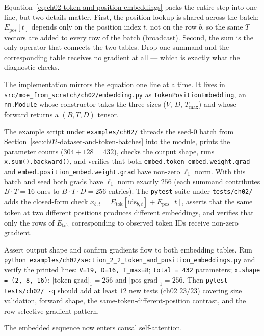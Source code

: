 

Equation~\ref{eq:ch02-token-and-position-embeddings} packs the entire step into one line, but two details matter. First, the position lookup is shared across the batch: $E_{\text{pos}}[t]$ depends only on the position index $t$, not on the row $b$, so the same $T$ vectors are added to every row of the batch (broadcast). Second, the sum is the only operator that connects the two tables. Drop one summand and the corresponding table receives no gradient at all --- which is exactly what the diagnostic checks.

The implementation mirrors the equation one line at a time. It lives in \texttt{src/moe\_from\_scratch/ch02/embedding.py} as \texttt{TokenPositionEmbedding}, an \texttt{nn.Module} whose constructor takes the three sizes ($V$, $D$, $T_{\max}$) and whose forward returns a $(B, T, D)$ tensor.



The example script under \texttt{examples/ch02/} threads the seed-$0$ batch from Section~\ref{sec:ch02-dataset-and-token-batches} into the module, prints the parameter counts ($304 + 128 = 432$), checks the output shape, runs \texttt{x.sum().backward()}, and verifies that both \texttt{embed.token\_embed.weight.grad} and \texttt{embed.position\_embed.weight.grad} have non-zero $\ell_1$ norm. With this batch and seed both grads have $\ell_1$ norm exactly $256$ (each summand contributes $B \cdot T = 16$ ones to $B \cdot T \cdot D = 256$ entries). The \texttt{pytest} suite under \texttt{tests/ch02/} adds the closed-form check $x_{b,t} = E_{\text{tok}}[\mathrm{ids}_{b,t}] + E_{\text{pos}}[t]$, asserts that the same token at two different positions produces different embeddings, and verifies that only the rows of $E_{\text{tok}}$ corresponding to observed token IDs receive non-zero gradient.

\begin{checkpointbox}
Assert output shape and confirm gradients flow to both embedding tables. Run \texttt{python examples/ch02/section\_2\_2\_token\_and\_position\_embeddings.py} and verify the printed lines: \texttt{V=19, D=16, T\_max=8}; \texttt{total = 432} parameters; \texttt{x.shape = (2, 8, 16)}; $|\text{token grad}|_1 = 256$ and $|\text{pos grad}|_1 = 256$. Then \texttt{pytest tests/ch02/ -q} should add at least $12$ new tests (ch02 $23/23$) covering size validation, forward shape, the same-token-different-position contrast, and the row-selective gradient pattern.
\end{checkpointbox}

The embedded sequence now enters causal self-attention.
